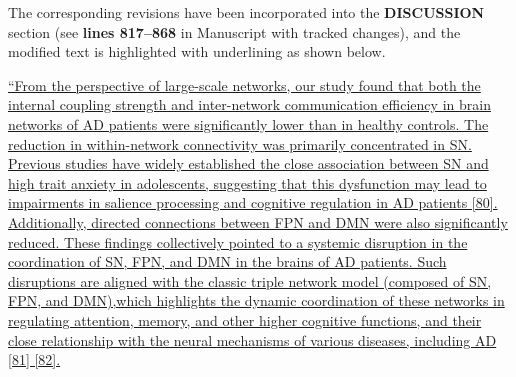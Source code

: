 \documentclass[12pt,technote,onecolumn]{IEEEtran}
\begin{document}
The corresponding revisions have been incorporated into the \textbf{DISCUSSION} section (see \textbf{lines 817–868} in Manuscript with tracked changes), and the modified text is highlighted with underlining as shown below.

\uline{``From the perspective of large-scale networks, our study found that both the internal coupling strength and inter-network communication efficiency in brain networks of AD patients were significantly lower than in healthy controls. The reduction in within-network connectivity was primarily concentrated in SN. Previous studies have widely established the close association between SN and high trait anxiety in adolescents, suggesting that this dysfunction may lead to impairments in salience processing and cognitive regulation in AD patients [80]. Additionally, directed connections between FPN and DMN were also significantly reduced. These findings collectively pointed to a systemic disruption in the coordination of SN, FPN, and DMN in the brains of AD patients. Such disruptions are aligned with the classic triple network model (composed of SN, FPN, and DMN),which highlights the dynamic coordination of these networks in regulating attention, memory, and other higher cognitive functions, and their close relationship with the neural mechanisms of various diseases, including AD [81] [82].} 
\end{document}
